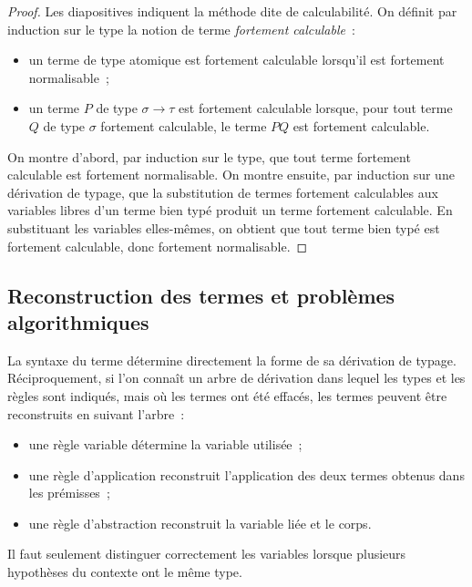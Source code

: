\begin{proof}
Les diapositives indiquent la méthode dite de calculabilité. On définit
par induction sur le type la notion de terme \emph{fortement
calculable} :
\begin{itemize}
\item un terme de type atomique est fortement calculable lorsqu'il est
  fortement normalisable ;
\item un terme $P$ de type $\sigma\to\tau$ est fortement calculable
  lorsque, pour tout terme $Q$ de type $\sigma$ fortement calculable,
  le terme $PQ$ est fortement calculable.
\end{itemize}
On montre d'abord, par induction sur le type, que tout terme fortement
calculable est fortement normalisable. On montre ensuite, par induction
sur une dérivation de typage, que la substitution de termes fortement
calculables aux variables libres d'un terme bien typé produit un terme
fortement calculable. En substituant les variables elles-mêmes, on
obtient que tout terme bien typé est fortement calculable, donc
fortement normalisable.

\end{proof}

\subsection{Reconstruction des termes et problèmes algorithmiques}

\thingy La syntaxe du terme détermine directement la forme de sa
dérivation de typage. Réciproquement, si l'on connaît un arbre de
dérivation dans lequel les types et les règles sont indiqués, mais où
les termes ont été effacés, les termes peuvent être reconstruits en
suivant l'arbre :
\begin{itemize}
\item une règle variable détermine la variable utilisée ;
\item une règle d'application reconstruit l'application des deux termes
  obtenus dans les prémisses ;
\item une règle d'abstraction reconstruit la variable liée et le corps.
\end{itemize}
Il faut seulement distinguer correctement les variables lorsque
plusieurs hypothèses du contexte ont le même type.

